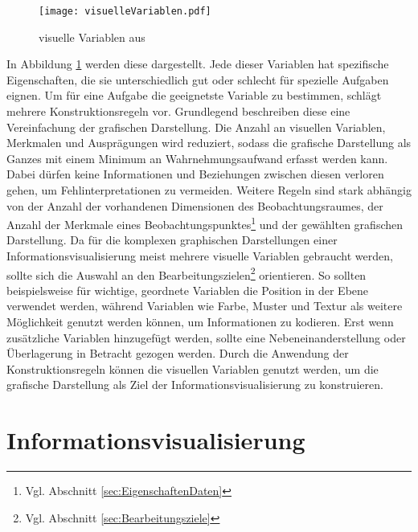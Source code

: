 \documentclass[a4paper, 12pt, DIVcalc, onepage, pdftex, headsepline, footsepline]{scrreprt}
\begin{document}
\begin{figure}
\centering
\texttt{[image: visuelleVariablen.pdf]}
\caption{visuelle Variablen aus \citep[S.\,51]{Bertin}}
\label{fig:visuelleVariablen}
\end{figure}
In Abbildung \ref{fig:visuelleVariablen} werden diese dargestellt.
Jede dieser Variablen hat spezifische Eigenschaften, die sie unterschiedlich gut oder schlecht
für spezielle Aufgaben eignen. Um für eine Aufgabe die geeignetste Variable zu bestimmen, schlägt
\citep{Bertin} mehrere Konstruktionsregeln vor.
Grundlegend beschreiben diese eine Vereinfachung der grafischen Darstellung.
Die Anzahl an visuellen Variablen, Merkmalen und Ausprägungen wird reduziert,
sodass die grafische Darstellung als Ganzes mit einem Minimum an Wahrnehmungsaufwand erfasst werden kann.
Dabei dürfen keine Informationen und Beziehungen zwischen diesen verloren gehen, um Fehlinterpretationen
zu vermeiden. Weitere Regeln sind stark abhängig von der Anzahl
der vorhandenen Dimensionen des Beobachtungsraumes, der Anzahl der Merkmale eines
Beobachtungspunktes\footnote{Vgl. Abschnitt \ref{sec:EigenschaftenDaten}} und der gewählten
grafischen Darstellung. Da für die komplexen graphischen Darstellungen einer 
Informationsvisualisierung meist mehrere visuelle Variablen gebraucht werden, sollte sich die Auswahl
an den Bearbeitungszielen\footnote{Vgl. Abschnitt \ref{sec:Bearbeitungsziele}} orientieren.
So sollten beispielsweise für wichtige, geordnete Variablen die Position in der Ebene verwendet werden,
während Variablen wie Farbe, Muster und Textur als weitere Möglichkeit genutzt werden können, um Informationen zu kodieren.
Erst wenn zusätzliche Variablen hinzugefügt werden, sollte eine Nebeneinanderstellung oder
Überlagerung in Betracht gezogen werden.
Durch die Anwendung der Konstruktionsregeln können die visuellen Variablen genutzt werden, um
die grafische Darstellung als Ziel der Informationsvisualisierung zu konstruieren.

\chapter{Informationsvisualisierung}
\label{cha:Informationsvisualisierung}
\end{document}
